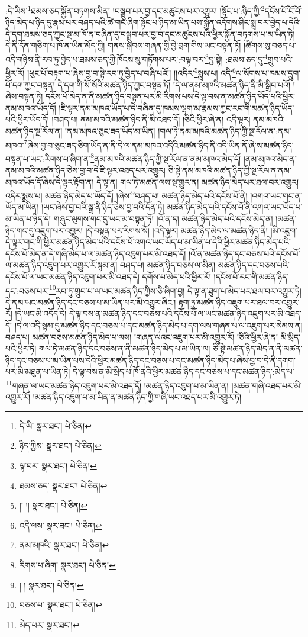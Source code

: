 :དེ་ཡིས་\footnote{དེ་ཡི་  སྣར་ཐང་།  པེ་ཅིན། }ཐམས་ཅད་སྐྱོན་བཏགས་མིན། །བསྒྲུབ་པར་བྱ་དང་མཚུངས་པར་འགྱུར། །སྟོང་པ་:ཉིད་ཀྱི་\footnote{ཉིད་ཀྱིས་  སྣར་ཐང་།  པེ་ཅིན། }དངོས་པོ་ངོ་བོ་ཉིད་མེད་པ་ཉིད་དུ་རྣམ་པར་བཤད་པའི་ཚེ་གང་ཞིག་སྟོང་པ་ཉིད་མ་ཡིན་པས་སྐྱོན་འདོགས་ཤིང་སྨྲ་བར་བྱེད་པ་དེའི་དེ་དག་ཐམས་ཅད་ཀྱང་སྔ་མ་ཁོ་ན་བཞིན་དུ་བསྒྲུབ་པར་བྱ་བ་དང་མཚུངས་པའི་ཕྱིར་སྐྱོན་བཏགས་པ་མ་ཡིན་ཏེ། དེ་ནི་དོན་གཅིག་པ་ཁོ་ན་ཡིན་མོད་ཀྱི། གནས་སྐབས་གཞན་གྱི་བྱེ་བྲག་གིས་ཡང་བསྟན་ཏོ། །ཚིགས་སུ་བཅད་པ་འདི་གཉིས་ནི་རབ་ཏུ་བྱེད་པ་ཐམས་ཅད་ཀྱི་ཁོངས་སུ་གཏོགས་པར་:བལྟ་བར་\footnote{ལྟ་བར་  སྣར་ཐང་།  པེ་ཅིན། }བྱ་སྟེ། :ཐམས་ཅད་དུ་\footnote{ཐམས་ཅད་  སྣར་ཐང་།  པེ་ཅིན། }གྲུབ་པའི་ཕྱིར་རོ། །ཕུང་པོ་བརྟག་པ་ཞེས་བྱ་བ་སྟེ་རབ་ཏུ་བྱེད་པ་བཞི་པའོ།། །།འདིར་\footnote{།། །།  སྣར་ཐང་།  པེ་ཅིན། }སྨྲས་པ། འདི་\footnote{འདི་ལས་  སྣར་ཐང་།  པེ་ཅིན། }ལ་སོགས་པ་ཁམས་དྲུག་པོ་དག་ཀྱང་བསྟན། དེ་དག་གི་སོ་སོའི་མཚན་ཉིད་ཀྱང་བསྟན་ཏོ། །དེ་ལ་ནམ་མཁའི་མཚན་ཉིད་ནི་མི་སྒྲིབ་པའོ། །ཞེས་བསྟན་ཏེ། དངོས་པོ་མེད་ན་ནི་མཚན་ཉིད་བསྟན་པར་མི་རིགས་པས་དེ་ལྟ་བས་ན་མཚན་ཉིད་ཡོད་པའི་ཕྱིར་ནམ་མཁའ་ཡོད་དོ། །ཇི་ལྟར་ནམ་མཁའ་ཡོད་པ་དེ་བཞིན་དུ་ཁམས་ལྷག་མ་རྣམས་ཀྱང་རང་གི་མཚན་ཉིད་ཡོད་པའི་ཕྱིར་ཡོད་དོ། །བཤད་པ། ནམ་མཁའི་མཚན་ཉིད་ནི་མི་འཐད་དོ། །ཅིའི་ཕྱིར་ཞེ་ན། འདི་ལྟར། ནམ་མཁའི་མཚན་ཉིད་སྔ་རོལ་ན། །ནམ་མཁའ་ཅུང་ཟད་ཡོད་མ་ཡིན། །གལ་ཏེ་ནམ་མཁའི་མཚན་ཉིད་ཀྱི་སྔ་རོལ་ན་:ནམ་མཁའ་\footnote{ནམ་མཁའི་  སྣར་ཐང་།  པེ་ཅིན། }ཞེས་བྱ་བ་ཅུང་ཟད་ཅིག་ཡོད་ན་ནི་དེ་ལ་ནམ་མཁའ་འདིའི་མཚན་ཉིད་ནི་འདི་ཡིན་ནོ་ཞེ་ས་མཚན་ཉིད་བསྟན་པ་ཡང་:རིགས་པ་ཞིག་ན་\footnote{རིགས་པ་ཞིག་  སྣར་ཐང་།  པེ་ཅིན། }ནམ་མཁའི་མཚན་ཉིད་ཀྱི་སྔ་རོལ་ན་ནམ་མཁའ་མེད་དོ། །ནམ་མཁའ་མེད་ན་ནམ་མཁའི་མཚན་ཉིད་ཅེས་བྱ་བ་དེ་ཇི་ལྟར་འཐད་པར་འགྱུར། ཅི་སྟེ་ནམ་མཁའི་མཚན་ཉིད་ཀྱི་སྔ་རོལ་ན་ནམ་མཁའ་ཡོད་དོ་ཞེས་དེ་ལྟར་རྟོག་ན། དེ་ལྟ་ན། གལ་ཏེ་མཚན་ལས་སྔ་གྱུར་ན། མཚན་ཉིད་མེད་པར་ཐལ་བར་འགྱུར། འདིར་སྨྲས་པ། མཚན་ཉིད་མེད་པ་ཡོད་དོ། །ཞེས་\footnote{། །  སྣར་ཐང་།  པེ་ཅིན། }བཤད་པ། མཚན་ཉིད་མེད་པའི་དངོས་པོ་ནི། །འགའ་ཡང་གང་ན་ཡོད་མ་ཡིན། །ཡང་ཞེས་བྱ་བའི་སྒྲ་ནི་ཉིད་ཅེས་བྱ་བའི་དོན་ཏེ། མཚན་ཉིད་མེད་པའི་དངོས་པོ་ནི་འགའ་ཡང་ཡོད་པ་མ་ཡིན་པ་ཉིད་དེ། གཞུང་ལུགས་གང་དུ་ཡང་མ་བསྟན་ཏོ། །འོ་ན་ད། མཚན་ཉིད་མེད་པའི་དངོས་མེད་ན། །མཚན་ཉིད་གང་དུ་འཇུག་པར་འགྱུར། །དེ་བསྟན་པར་རིགས་སོ། །འདི་ལྟར། མཚན་ཉིད་མེད་ལ་མཚན་ཉིད་ནི། །མི་འཇུག་དེ་ལྟར་གང་གི་ཕྱིར་མཚན་ཉིད་མེད་པའི་དངོས་པོ་འགའ་ཡང་ཡོད་པ་མ་ཡིན་པ་དེའི་ཕྱིར་མཚན་ཉིད་མེད་པའི་དངོས་པོ་མེད་ན་དེ་གཞི་མེད་པ་ལ་མཚན་ཉིད་འཇུག་པར་མི་འཐད་དོ། །འོ་ན་མཚན་ཉིད་དང་བཅས་པའི་དངོས་པོ་ལ་མཚན་ཉིད་འཇུག་པར་འགྱུར་རོ་སྙམ་ན། བཤད་པ། མཚན་ཉིད་བཅས་ལ་མིན། མཚན་ཉིད་དང་བཅས་པའི་དངོས་པོ་ལ་ཡང་མཚན་ཉིད་འཇུག་པར་མི་འཐད་དེ། དགོས་པ་མེད་པའི་ཕྱིར་རོ། །དངོས་པོ་རང་གི་མཚན་ཉིད་དང་:བཅས་པར་\footnote{བཅས་པ་  སྣར་ཐང་།  པེ་ཅིན། }རབ་ཏུ་གྲུབ་པ་ལ་ཡང་མཚན་ཉིད་ཀྱིས་ཅི་ཞིག་བྱ། དེ་ལྟ་ན་ཐུག་པ་མེད་པར་ཐལ་བར་འགྱུར་ཏེ། དེ་ནམ་ཡང་མཚན་ཉིད་དང་བཅས་པ་མ་ཡིན་པར་མི་འགྱུར་ཞིང་། རྟག་ཏུ་མཚན་ཉིད་འཇུག་པར་ཐལ་བར་འགྱུར་རོ། །དེ་ཡང་མི་འདོད་དེ། དེ་ལྟ་བས་ན་མཚན་ཉིད་དང་བཅས་པའི་དངོས་པོ་ལ་ཡང་མཚན་ཉིད་འཇུག་པར་མི་འཐད་དོ། །དེ་ལ་འདི་སྙམ་དུ་མཚན་ཉིད་དང་བཅས་པ་དང་མཚན་ཉིད་མེད་པ་དག་ལས་གཞན་པ་ལ་འཇུག་པར་སེམས་ན། བཤད་པ། མཚན་བཅས་མཚན་ཉིད་མེད་པ་ལས། །གཞན་ལའང་འཇུག་པར་མི་འགྱུར་རོ། །ཅིའི་ཕྱིར་ཞེ་ན། མི་སྲིད་པའི་ཕྱིར་ཏེ། གལ་ཏེ་མཚན་ཉིད་དང་བཅས་ན་ནི་མཚན་ཉིད་མེད་པ་མ་ཡིན་ལ། ཅི་སྟེ་མཚན་ཉིད་མེད་ན་ནི་མཚན་ཉིད་དང་བཅས་པ་མ་ཡིན་པས་དེའི་ཕྱིར་མཚན་ཉིད་དང་བཅས་པ་དང་མཚན་ཉིད་མེད་པ་ཞེས་བྱ་བ་དེ་ནི་དགག་པར་མི་མཐུན་པ་ཡིན་ཏེ། དེ་ལྟ་བས་ན་མི་སྲིད་པ་ཁོ་ནའི་ཕྱིར་མཚན་ཉིད་དང་བཅས་པ་དང་མཚན་ཉིད་:མེད་པ་\footnote{མེད་པར་  སྣར་ཐང་། }གཞན་ལ་ཡང་མཚན་ཉིད་འཇུག་པར་མི་འཐད་དོ། །མཚན་ཉིད་འཇུག་པ་མ་ཡིན་ན། །མཚན་གཞི་འཐད་པར་མི་འགྱུར་རོ། །མཚན་ཉིད་འཇུག་པ་མ་ཡིན་ན་མཚན་ཉིད་ཀྱི་གཞི་ཡང་འཐད་པར་མི་འགྱུར་ཏེ། 
